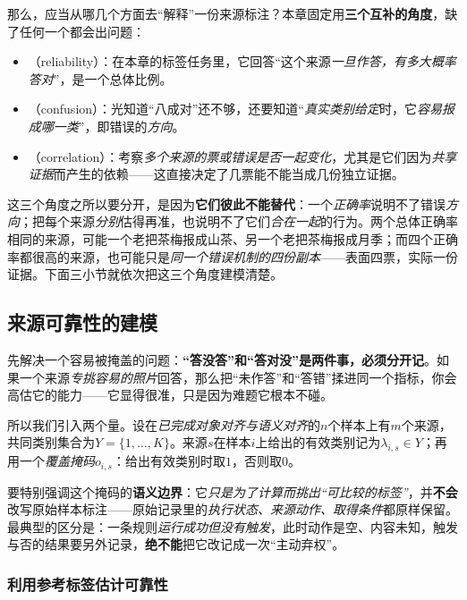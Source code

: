 那么，应当从哪几个方面去“解释”一份来源标注？本章固定用\textbf{三个互补的角度}，缺了任何一个都会出问题：

\begin{itemize}\item {}（reliability）：在本章的标签任务里，它回答“这个来源\emph{一旦作答，有多大概率答对}”，是一个总体比例。\item {}（confusion）：光知道“八成对”还不够，还要知道“\emph{真实类别给定}时，它\emph{容易报成哪一类}”，即错误的\emph{方向}。\item {}（correlation）：考察\emph{多个来源的票或错误是否一起变化}，尤其是它们因为\emph{共享证据}而产生的依赖——这直接决定了几票能不能当成几份独立证据。\end{itemize}

这三个角度之所以要分开，是因为\textbf{它们彼此不能替代}：一个\emph{正确率}说明不了错误\emph{方向}；把每个来源\emph{分别}估得再准，也说明不了它们\emph{合在一起}的行为。两个总体正确率相同的来源，可能一个老把茶梅报成山茶、另一个老把茶梅报成月季；而四个正确率都很高的来源，也可能只是\emph{同一个错误机制的四份副本}——表面四票，实际一份证据。下面三小节就依次把这三个角度建模清楚。

\subsection{来源可靠性的建模}
\label{sec:knowledge-fusion-reliability}

先解决一个容易被掩盖的问题：\textbf{“答没答”和“答对没”是两件事，必须分开记}。如果一个来源\emph{专挑容易的照片}回答，那么把“未作答”和“答错”揉进同一个指标，你会高估它的能力——它显得很准，只是因为难题它根本不碰。

所以我们引入两个量。设在\emph{已完成对象对齐与语义对齐}的$n$个样本上有$m$个来源，共同类别集合为$Y=\{1,\ldots,K\}$。来源$s$在样本$i$上给出的有效类别记为$\lambda_{i,s}\in Y$；再用一个\emph{覆盖掩码}$o_{i,s}$：给出有效类别时取$1$，否则取$0$。

要特别强调这个掩码的\textbf{语义边界}：它\emph{只是为了计算而挑出“可比较的标签”}，并\textbf{不会}改写原始样本标注——原始记录里的\emph{执行状态、来源动作、取得条件}都原样保留。最典型的区分是：一条规则\emph{运行成功但没有触发}，此时动作是空、内容未知，触发与否的结果要另外记录，\textbf{绝不能}把它改记成一次“主动弃权”。

\subsubsection{利用参考标签估计可靠性}
\label{sec:knowledge-fusion-reference-reliability}

